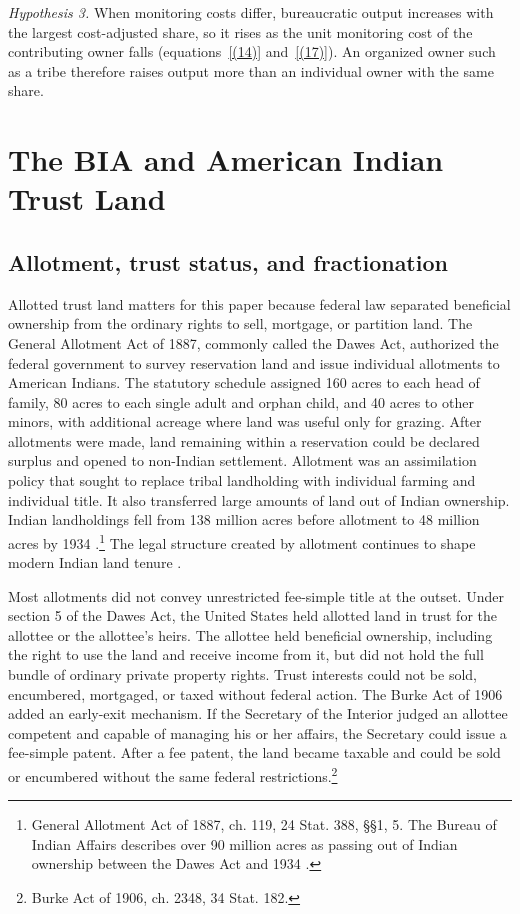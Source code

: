 \documentclass[12pt]{article}
\begin{document}
\smallskip\noindent\textit{Hypothesis 3.} When monitoring costs differ, bureaucratic output increases with the largest cost-adjusted share, so it rises as the unit monitoring cost of the contributing owner falls (equations~\eqref{(14)} and~\eqref{(17)}). An organized owner such as a tribe therefore raises output more than an individual owner with the same share.




\section{The BIA and American Indian Trust Land} \label{Background}

\subsection{Allotment, trust status, and fractionation} \label{History}

Allotted trust land matters for this paper because federal law separated beneficial ownership from the ordinary rights to sell, mortgage, or partition land. The General Allotment Act of 1887, commonly called the Dawes Act, authorized the federal government to survey reservation land and issue individual allotments to American Indians. The statutory schedule assigned 160 acres to each head of family, 80 acres to each single adult and orphan child, and 40 acres to other minors, with additional acreage where land was useful only for grazing. After allotments were made, land remaining within a reservation could be declared surplus and opened to non-Indian settlement. Allotment was an assimilation policy that sought to replace tribal landholding with individual farming and individual title. It also transferred large amounts of land out of Indian ownership. Indian landholdings fell from 138 million acres before allotment to 48 million acres by 1934 \citep{Carlson1981,Otis2014,McDonnell1991,DippelFryeLeonard2025}.\footnote{General Allotment Act of 1887, ch. 119, 24 Stat. 388, \S\S 1, 5. The Bureau of Indian Affairs describes over 90 million acres as passing out of Indian ownership between the Dawes Act and 1934 \citep{BIAIndianLandConsolidationHistory}.} The legal structure created by allotment continues to shape modern Indian land tenure \citep{Royster1995,Shoemaker2020}.

Most allotments did not convey unrestricted fee-simple title at the outset. Under section 5 of the Dawes Act, the United States held allotted land in trust for the allottee or the allottee's heirs. The allottee held beneficial ownership, including the right to use the land and receive income from it, but did not hold the full bundle of ordinary private property rights. Trust interests could not be sold, encumbered, mortgaged, or taxed without federal action. The Burke Act of 1906 added an early-exit mechanism. If the Secretary of the Interior judged an allottee competent and capable of managing his or her affairs, the Secretary could issue a fee-simple patent. After a fee patent, the land became taxable and could be sold or encumbered without the same federal restrictions.\footnote{Burke Act of 1906, ch. 2348, 34 Stat. 182.}
\end{document}
